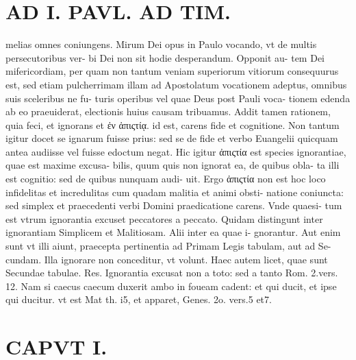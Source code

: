 \documentclass{article}
\begin{document}
\begin{pages}
\section*{AD I. PAVL. AD TIM. }
\marginpar{[ p.26 ]}\pstart melias omnes coniungens. Mirum Dei opus in Paulo vocando, vt de multis persecutoribus ver- bi Dei non sit hodie desperandum. Opponit au- tem Dei mifericordiam, per quam non tantum veniam superiorum vitiorum consequurus est, sed etiam pulcherrimam illam ad Apostolatum vocationem adeptus, omnibus suis sceleribus ne fu- turis operibus vel quae Deus post Pauli voca- tionem edenda ab eo praeuiderat, electionis huius causam tribuamus. Addit tamen rationem, quia feci, et ignorans et ἐν ἀπιςτίᾳ. id est, carens fide et cognitione. Non tantum igitur docet se ignarum fuisse prius: sed se de fide et verbo Euangelii quicquam antea audiisse vel fuisse edoctum negat. Hic igitur ἀπιςτία est species ignorantiae, quae est maxime excusa- bilis, quum quis non ignorat ea, de quibus obla- ta illi est cognitio: sed de quibus nunquam audi- uit. Ergo ἀπιςτία non est hoc loco infidelitas et incredulitas cum quadam malitia et animi obsti- natione coniuncta: sed simplex et praecedenti verbi Domini praedicatione carens. Vnde quaesi- tum est vtrum ignorantia excuset peccatores a peccato. Quidam distingunt inter ignorantiam Simplicem et Malitiosam. Alii inter ea quae i- gnorantur. Aut enim sunt vt illi aiunt, praecepta pertinentia ad Primam Legis tabulam, aut ad Se- cundam. Illa ignorare non conceditur, vt volunt. Haec autem licet, quae sunt Secundae tabulae. Res. Ignorantia excusat non a toto: sed a tanto Rom. 2.vers. 12. Nam si caecus caecum duxerit ambo in foueam cadent: et qui ducit, et ipse qui ducitur. vt est Mat th. i5, et apparet, Genes. 2o. vers.5 et7.  \pend
\section*{CAPVT  I. }
\marginpar{[ p.27 ]}\pstart {}
{}

\end{pages}
\end{document}

